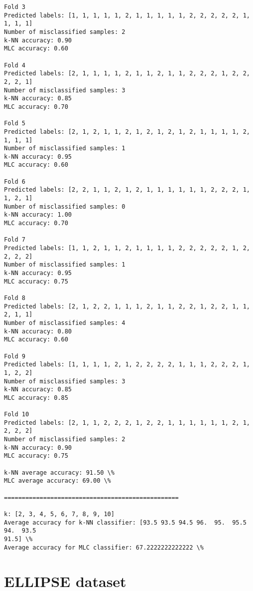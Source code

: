 \documentclass[11pt]{article}
\begin{document}
\begin{Verbatim}[commandchars=\\\{\}]
Fold 3
Predicted labels: [1, 1, 1, 1, 1, 2, 1, 1, 1, 1, 1, 2, 2, 2, 2, 2, 1, 1, 1, 1]
Number of misclassified samples: 2
k-NN accuracy: 0.90
MLC accuracy: 0.60

Fold 4
Predicted labels: [2, 1, 1, 1, 1, 2, 1, 1, 2, 1, 1, 2, 2, 2, 1, 2, 2, 2, 2, 1]
Number of misclassified samples: 3
k-NN accuracy: 0.85
MLC accuracy: 0.70

Fold 5
Predicted labels: [2, 1, 2, 1, 1, 2, 1, 2, 1, 2, 1, 2, 1, 1, 1, 1, 2, 1, 1, 1]
Number of misclassified samples: 1
k-NN accuracy: 0.95
MLC accuracy: 0.60

Fold 6
Predicted labels: [2, 2, 1, 1, 2, 1, 2, 1, 1, 1, 1, 1, 1, 2, 2, 2, 1, 1, 2, 1]
Number of misclassified samples: 0
k-NN accuracy: 1.00
MLC accuracy: 0.70

Fold 7
Predicted labels: [1, 1, 2, 1, 1, 2, 1, 1, 1, 1, 2, 2, 2, 2, 2, 1, 2, 2, 2, 2]
Number of misclassified samples: 1
k-NN accuracy: 0.95
MLC accuracy: 0.75

Fold 8
Predicted labels: [2, 1, 2, 2, 1, 1, 1, 2, 1, 1, 2, 2, 1, 2, 2, 1, 1, 2, 1, 1]
Number of misclassified samples: 4
k-NN accuracy: 0.80
MLC accuracy: 0.60

Fold 9
Predicted labels: [1, 1, 1, 1, 2, 1, 2, 2, 2, 2, 1, 1, 1, 2, 2, 2, 1, 1, 2, 2]
Number of misclassified samples: 3
k-NN accuracy: 0.85
MLC accuracy: 0.85

Fold 10
Predicted labels: [2, 1, 1, 2, 2, 2, 1, 2, 2, 1, 1, 1, 1, 1, 1, 2, 1, 2, 2, 2]
Number of misclassified samples: 2
k-NN accuracy: 0.90
MLC accuracy: 0.75

k-NN average accuracy: 91.50 \%
MLC average accuracy: 69.00 \%

=================================================

k: [2, 3, 4, 5, 6, 7, 8, 9, 10]
Average accuracy for k-NN classifier: [93.5 93.5 94.5 96.  95.  95.5 94.  93.5
91.5] \%
Average accuracy for MLC classifier: 67.2222222222222 \%

    \end{Verbatim}

    \hypertarget{ellipse-dataset}{%
\section{ELLIPSE dataset}\label{ellipse-dataset}}
\end{document}
